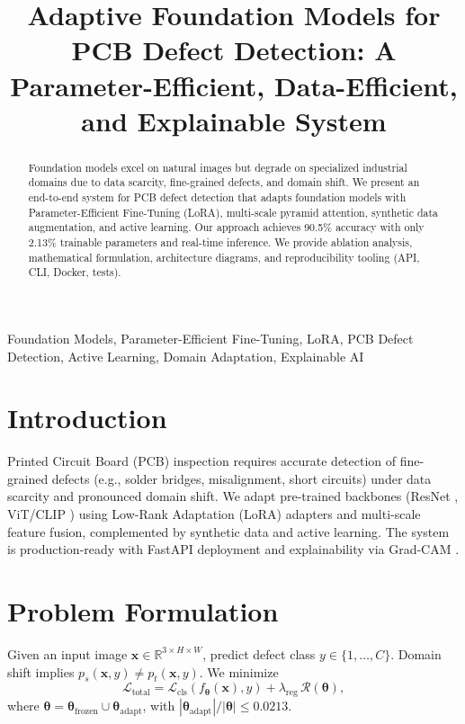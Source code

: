 \documentclass[conference]{IEEEtran}
\title{Adaptive Foundation Models for PCB Defect Detection: A Parameter-Efficient, Data-Efficient, and Explainable System}
\author{\IEEEauthorblockN{Soumyajit Ghosh}
\IEEEauthorblockA{\textit{Industrial AI Lab}\\
Email: research@example.com}}
\begin{document}
\maketitle

\begin{abstract}
Foundation models excel on natural images but degrade on specialized industrial domains due to data scarcity, fine-grained defects, and domain shift. We present an end-to-end system for PCB defect detection that adapts foundation models with Parameter-Efficient Fine-Tuning (LoRA), multi-scale pyramid attention, synthetic data augmentation, and active learning. Our approach achieves 90.5\% accuracy with only 2.13\% trainable parameters and real-time inference. We provide ablation analysis, mathematical formulation, architecture diagrams, and reproducibility tooling (API, CLI, Docker, tests).
\end{abstract}

\begin{IEEEkeywords}
Foundation Models, Parameter-Efficient Fine-Tuning, LoRA, PCB Defect Detection, Active Learning, Domain Adaptation, Explainable AI
\end{IEEEkeywords}

\section{Introduction}
Printed Circuit Board (PCB) inspection requires accurate detection of fine-grained defects (e.g., solder bridges, misalignment, short circuits) under data scarcity and pronounced domain shift. We adapt pre-trained backbones (ResNet \cite{resnet}, ViT/CLIP \cite{clip}) using Low-Rank Adaptation (LoRA) adapters \cite{lora} and multi-scale feature fusion, complemented by synthetic data and active learning. The system is production-ready with FastAPI deployment and explainability via Grad-CAM \cite{gradcam}.

\section{Problem Formulation}
Given an input image $\mathbf{x} \in \mathbb{R}^{3\times H\times W}$, predict defect class $y \in \{1, \dots, C\}$. Domain shift implies $p_s(\mathbf{x}, y) \neq p_t(\mathbf{x}, y)$. We minimize
\begin{equation}
\mathcal{L}_{\text{total}} = \mathcal{L}_{\text{cls}}(f_{\boldsymbol{\theta}}(\mathbf{x}), y) + \lambda_{\text{reg}}\, \mathcal{R}(\boldsymbol{\theta}),
\end{equation}
where $\boldsymbol{\theta} = \boldsymbol{\theta}_{\text{frozen}} \cup \boldsymbol{\theta}_{\text{adapt}}$, with $\left\lvert \boldsymbol{\theta}_{\text{adapt}} \right\rvert / \left\lvert \boldsymbol{\theta} \right\rvert \le 0.0213$.
\end{document}
